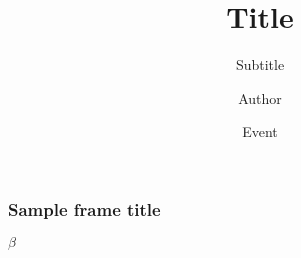 \documentclass{beamer}
\title{Title}
\subtitle{Subtitle}
\author{Author}
\institute{Institute}
\date{Event}
\begin{document}
\frame{\titlepage}

\begin{frame}
\frametitle{Sample frame title}
\blindtext\alpha$\beta$
\end{frame}
\end{document}
